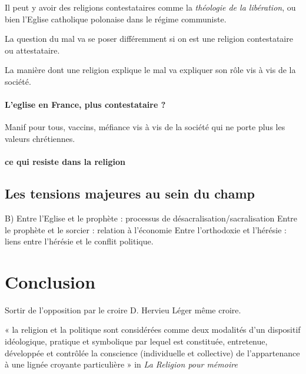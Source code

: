 \begin{Ex}
    Il peut y avoir des religions contestataires comme la \textit{théologie de la libération}, ou bien l'Eglise catholique polonaise dans le régime communiste. 
\end{Ex}

La question du mal va se poser différemment si on est une religion contestataire ou attestataire.
\begin{Ex}
    La manière dont une religion explique le mal va expliquer son rôle vis à vis de la société. 
\end{Ex}

\paragraph{L'eglise en France, plus contestataire ?} Manif pour tous, vaccins, méfiance vis à vis de la société qui ne porte plus les valeurs chrétiennes.


\paragraph{ce qui resiste dans la religion}
      
      
      \subsection{ Les tensions majeures au sein du champ }
      B) Entre l’Eglise et le prophète : processus de désacralisation/sacralisation Entre le prophète et le sorcier : relation à l’économie Entre l’orthodoxie et l’hérésie : liens entre l’hérésie et le conflit politique.      
      
      
      \section{Conclusion}
      
      Sortir de l’opposition par le croire D. Hervieu Léger même croire. 
      
      \begin{Def}[Le croire]
         « la religion et la politique sont considérées comme deux modalités d’un dispositif idéologique, pratique et symbolique par lequel est constituée, entretenue, développée et contrôlée la conscience (individuelle et collective) de l’appartenance à une lignée croyante particulière » in \textit{La Religion pour mémoire }
      \end{Def}   
